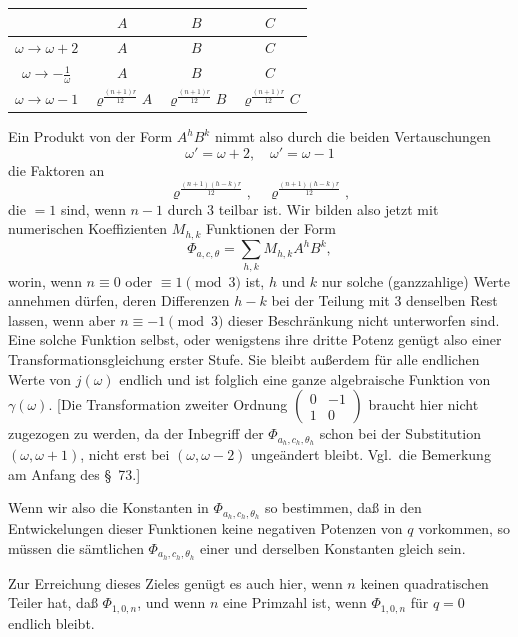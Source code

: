 \documentclass[12pt,a4paper]{article}
\theoremstyle{definition}
\begin{document}
\begin{center}
\begin{tabular}{c|ccc}
& $A$ & $B$ & $C$ \\
\midrule
$\omega \to \omega + 2$ & $A$ & $B$ & $C$ \\
$\omega \to -\frac{1}{\omega}$ & $A$ & $B$ & $C$ \\
$\omega \to \omega - 1$ & $\varrho^{\frac{(n+1)r}{12}} A$ & $\varrho^{\frac{(n+1)r}{12}} B$ & $\varrho^{\frac{(n+1)r}{12}} C$ \\
\end{tabular}
\end{center}

Ein Produkt von der Form $A^h B^k$ nimmt also durch die beiden Vertauschungen
\[
\omega' = \omega + 2, \quad \omega' = \omega - 1
\]
die Faktoren an
\[
\varrho^{\frac{(n+1)(h-k)r}{12}}, \quad \varrho^{\frac{(n+1)(h-k)r}{12}},
\]
die $= 1$ sind, wenn $n - 1$ durch 3 teilbar ist. Wir bilden also jetzt mit numerischen Koeffizienten $M_{h,k}$ Funktionen der Form
\begin{equation}\label{eq:75-5}
\Phi_{a,c,\theta} = \sum_{h,k} M_{h,k} A^h B^k,
\end{equation}
worin, wenn $n \equiv 0$ oder $\equiv 1 \pmod{3}$ ist, $h$ und $k$ nur solche (ganzzahlige) Werte annehmen dürfen, deren Differenzen $h - k$ bei der Teilung mit 3 denselben Rest lassen, wenn aber $n \equiv -1 \pmod{3}$ dieser Beschränkung nicht unterworfen sind. Eine solche Funktion selbst, oder wenigstens ihre dritte Potenz genügt also einer Transformationsgleichung erster Stufe. Sie bleibt außerdem für alle endlichen Werte von $j(\omega)$ endlich und ist folglich eine ganze algebraische Funktion von $\gamma(\omega)$. [Die Transformation zweiter Ordnung $\begin{pmatrix} 0 & -1 \\ 1 & 0 \end{pmatrix}$ braucht hier nicht zugezogen zu werden, da der Inbegriff der $\Phi_{a_h,c_h,\theta_h}$ schon bei der Substitution $(\omega, \omega + 1)$, nicht erst bei $(\omega, \omega - 2)$ ungeändert bleibt. Vgl.\ die Bemerkung am Anfang des \S\ 73.]

Wenn wir also die Konstanten in $\Phi_{a_h,c_h,\theta_h}$ so bestimmen, daß in den Entwickelungen dieser Funktionen keine negativen Potenzen von $q$ vorkommen, so müssen die sämtlichen $\Phi_{a_h,c_h,\theta_h}$ einer und derselben Konstanten gleich sein.

Zur Erreichung dieses Zieles genügt es auch hier, wenn $n$ keinen quadratischen Teiler hat, daß $\Phi_{1,0,n}$, und wenn $n$ eine Primzahl ist, wenn $\Phi_{1,0,n}$ für $q = 0$ endlich bleibt.
\end{document}
